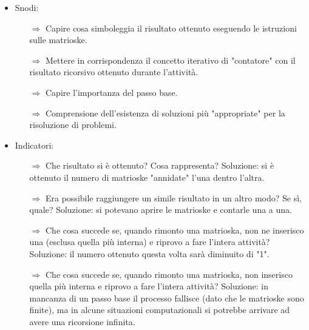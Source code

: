 \begin{itemize}
    \item Snodi:
    \begin{itemize}
        \item [$\Rightarrow$] Capire cosa simboleggia il risultato ottenuto eseguendo le istruzioni sulle matrioske.
        \item [$\Rightarrow$] Mettere in corrispondenza il concetto iterativo di "contatore" con il risultato
        ricorsivo ottenuto durante l'attività.
        \item [$\Rightarrow$] Capire l'importanza del passo base.
        \item [$\Rightarrow$] Comprensione dell'esistenza di soluzioni più "appropriate" per la risoluzione di problemi.
    \end{itemize}
    \item Indicatori:
    \begin{itemize}
        \item [$\Rightarrow$] Che risultato si è ottenuto? Cosa rappresenta? Soluzione: si è ottenuto il numero di matrioske "annidate" l'una dentro l'altra.
        \item [$\Rightarrow$] Era possibile raggiungere un simile risultato in un altro modo? Se sì, quale? Soluzione: si potevano aprire le matrioske e contarle una a una.
        \item [$\Rightarrow$] Che cosa succede se, quando rimonto una matrioska, non ne inserisco una (esclusa quella più interna) e riprovo a fare l'intera attività? Soluzione: il numero ottenuto questa volta sarà diminuito di "1".
        \item [$\Rightarrow$] Che cosa succede se, quando rimonto una matrioska, non inserisco quella più interna e riprovo a fare l'intera attività? Soluzione: in mancanza di un passo base il processo fallisce (dato che le matrioske sono finite),
         ma in alcune situazioni computazionali si potrebbe arrivare ad avere una ricorsione infinita. 
    \end{itemize}
\end{itemize}

\paragraph{}

